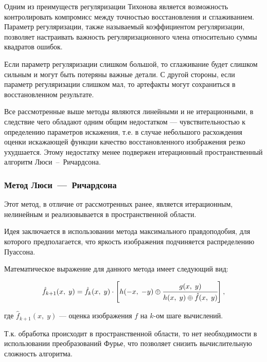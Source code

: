 Одним из преимуществ регуляризации Тихонова является возможность контролировать компромисс между точностью восстановления и сглаживанием. Параметр регуляризации, также называемый коэффициентом регуляризации, позволяет настраивать важность регуляризационного члена относительно суммы квадратов ошибок.

Если параметр регуляризации слишком большой, то сглаживание будет слишком сильным и могут быть потеряны важные детали. С другой стороны, если параметр регуляризации слишком мал, то артефакты могут сохраниться в восстановленном результате.


Все рассмотренные выше методы являются линейными и не итерационными, в следствие чего обладают одним общим недостатком --- чувствительностью к определению параметров искажения, т.е. в случае небольшого расхождения оценки искажающей функции качество восстановленного изображения резко ухудшается. Этому недостатку менее подвержен итерационный пространственный алгоритм Люси~--~Ричардсона.

\clearpage

\subsubsection{Метод Люси~---~Ричардсона}

Этот метод, в отличие от рассмотренных ранее, является итерационным, нелинейным и реализовывается в пространственной области.

Идея заключается в использовании метода максимального правдоподобия, для которого предполагается, что яркость изображения подчиняется распределению Пуассона. 

Математическое выражение для данного метода имеет следующий вид:

\begin{equation}
	\hat{f}_{k+1}(x,\;y) = \hat{f}_{k}(x,\;y) \cdot \left[h(-x,\;-y) \oplus \cfrac{g(x,\;y)}{h(x,\;y)\oplus \hat{f}(x,\;y)} \right], 
\end{equation}

где $\hat{f}_{k+1}(x,\;y)$ --- оценка изображения $f$ на $k$-ом шаге вычислений.

Т.к. обработка происходит в пространственной области, то нет необходимости в использовании преобразований Фурье, что позволяет снизить вычислительную сложность алгоритма.

